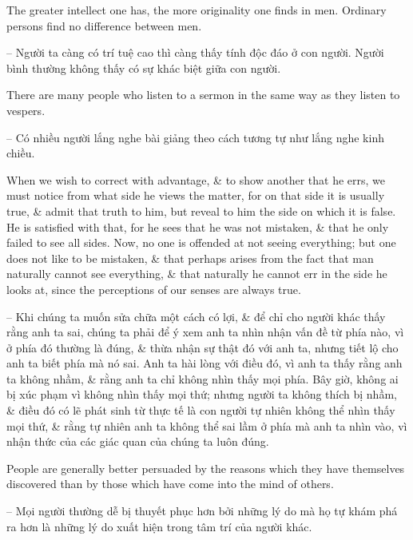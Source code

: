 \documentclass{article}
\begin{document}
\begin{enumerate}
\begin{itemize}
		 The greater intellect one has, the more originality one finds in men. Ordinary persons find no difference between men.
		
		-- Người ta càng có trí tuệ cao thì càng thấy tính độc đáo ở con người. Người bình thường không thấy có sự khác biệt giữa con người.
		
		 There are many people who listen to a sermon in the same way as they listen to vespers.
		
		-- Có nhiều người lắng nghe bài giảng theo cách tương tự như lắng nghe kinh chiều.
		
		 When we wish to correct with advantage, \& to show another that he errs, we must notice from what side he views the matter, for on that side it is usually true, \& admit that truth to him, but reveal to him the side on which it is false. He is satisfied with that, for he sees that he was not mistaken, \& that he only failed to see all sides. Now, no one is offended at not seeing everything; but one does not like to be mistaken, \& that perhaps arises from the fact that man naturally cannot see everything, \& that naturally he cannot err in the side he looks at, since the perceptions of our senses are always true.
		
		-- Khi chúng ta muốn sửa chữa một cách có lợi, \& để chỉ cho người khác thấy rằng anh ta sai, chúng ta phải để ý xem anh ta nhìn nhận vấn đề từ phía nào, vì ở phía đó thường là đúng, \& thừa nhận sự thật đó với anh ta, nhưng tiết lộ cho anh ta biết phía mà nó sai. Anh ta hài lòng với điều đó, vì anh ta thấy rằng anh ta không nhầm, \& rằng anh ta chỉ không nhìn thấy mọi phía. Bây giờ, không ai bị xúc phạm vì không nhìn thấy mọi thứ; nhưng người ta không thích bị nhầm, \& điều đó có lẽ phát sinh từ thực tế là con người tự nhiên không thể nhìn thấy mọi thứ, \& rằng tự nhiên anh ta không thể sai lầm ở phía mà anh ta nhìn vào, vì nhận thức của các giác quan của chúng ta luôn đúng.
		
		 People are generally better persuaded by the reasons which they have themselves discovered than by those which have come into the mind of others.
		
		-- Mọi người thường dễ bị thuyết phục hơn bởi những lý do mà họ tự khám phá ra hơn là những lý do xuất hiện trong tâm trí của người khác.
		

\end{itemize}
\end{enumerate}
\end{document}

